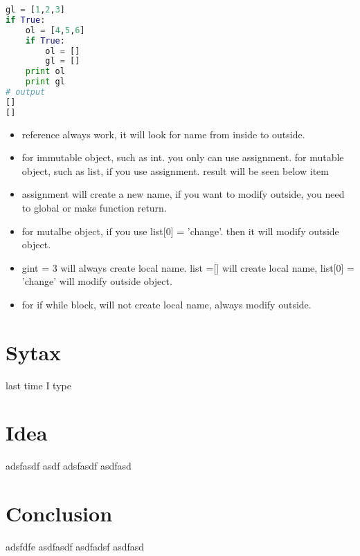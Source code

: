 \documentclass[a4paper,12pt,twoside]{book}
\begin{document}
\begin{lstlisting}[frame=single, language=python]
gl = [1,2,3]
if True:
	ol = [4,5,6]
	if True:
		ol = []
		gl = []
	print ol
	print gl
# output 
[]
[]
\end{lstlisting}  





\begin{itemize}
		\item reference always work, it will look for name from inside to outside.
		\item for immutable object, such as int. you only can use assignment. for mutable object, such as list, if you use assignment. result will be seen below item
		\item assignment will create a new name, if you want to modify outside, you need to global or make function return.
		\item for mutalbe object, if you use list[0] = 'change'. then it will modify outside object.
		\item gint = 3 will always create local name. list =[] will create local name, list[0] = 'change' will modify outside object.
		\item for if while block, will not create local name, always modify outside. 
\end{itemize}

\chapter{Sytax}

last time I type



\chapter{Idea}

adsfasdf
asdf
adsfasdf
asdfasd


\chapter{Conclusion}

adsfdfe
asdfasdf
asdfadsf
asdfasd


%
\end{document}
